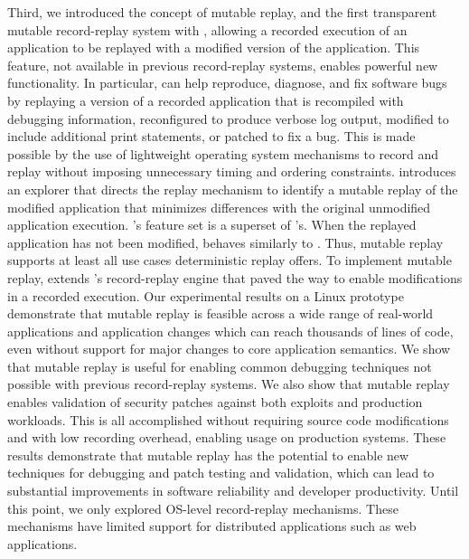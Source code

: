 Third, we introduced the concept of mutable replay, and the first transparent
mutable record-replay system with \dora, allowing a recorded execution of an
application to be replayed with a modified version of the application. This
feature, not available in previous record-replay systems, enables powerful new
functionality. In particular, \dora can help reproduce, diagnose, and fix
software bugs by replaying a version of a recorded application that is
recompiled with debugging information, reconfigured to produce verbose log
output, modified to include additional print statements, or patched to fix a
bug.  This is made possible by the use of lightweight operating system
mechanisms to record and replay without imposing unnecessary timing and ordering
constraints.  \dora introduces an explorer that directs the replay mechanism to
identify a mutable replay of the modified application that minimizes differences
with the original unmodified application execution.
\dora's feature set is a superset of \scribe's. When the replayed application
has not been modified, \dora behaves similarly to \scribe. Thus, mutable replay
supports at least all use cases deterministic replay offers.
To implement mutable replay, \dora extends \racepro's record-replay engine
that paved the way to enable modifications in a recorded execution.
Our experimental results on a Linux prototype demonstrate that mutable
replay is feasible across a wide range of real-world applications and
application changes which can reach thousands of lines of code, even
without support for major changes to core application semantics.  We
show that mutable replay is useful for enabling common debugging
techniques not possible with previous record-replay systems.  We
also show that mutable replay enables validation of security patches
against both exploits and production workloads. This is all
accomplished without requiring source code modifications and with low
recording overhead, enabling usage on production systems.  These
results demonstrate that mutable replay has the potential to enable
new techniques for debugging and patch testing and validation, which
can lead to substantial improvements in software reliability and developer
productivity.
Until this point, we only explored OS-level record-replay mechanisms.
These mechanisms have limited support for distributed applications such as web
applications.


